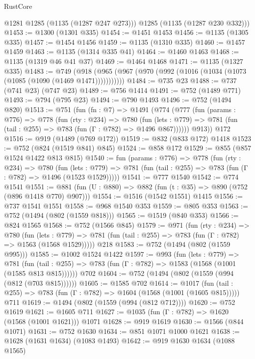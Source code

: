 \begin{lexlean}{RustCore}
\begin{coremodule}
        @1281
        @1285
        (@1135 (@1287 @247 @273)))
      @1285
      (@1135 (@1287 @230 @332)))
@1453 := @1300 (@1301 @335)
@1454 := @1451 @1453
@1456 := @1135 (@1305 @335)
@1457 := @1454 @1456
@1459 := @1135 (@1310 @335)
@1460 := @1457 @1459
@1463 := @1135 (@1314 @335 @41)
@1464 := @1460 @1463
@1468 := @1135 (@1319 @46 @41 @37)
@1469 := @1464 @1468
@1471 := @1135 (@1327 @335)
@1483 := @749
    (@918 (@965 (@967 (@970 (@992 (@1016 (@1034 (@1073 (@1085 (@1090 (@1469 @1471)))))))))))
@1484 := @735 @23
@1488 := @737 (@741 @23) (@747 @23)
@1489 := @756 @1414
@1491 := @752 (@1489 @771)
@1493 := @794 (@795 @23)
@1494 := @790 @1493
@1496 := @752 (@1494 @820)
@1513 := @751
    (fun (fn : @7) =>
    @1491
      (@774
        (@777
          (fun (params : @776) =>
          @778
            (fun (rty : @234) =>
            @780
              (fun (lets : @779) =>
              @781 (fun (tail : @255) => @783 (fun (Γ : @782) => @1496 @867))))))
        @913))
    @172
@1516 := @919 (@1489 (@769 @172))
@1519 := @832 (@833 @172) @1418
@1523 := @752 (@824 (@1519 @841) @845)
@1524 := @858 @172
@1529 := @855 (@857 @1524 @1422 @813 @815)
@1540 := fun (params : @776) =>
  @778
    (fun (rty : @234) =>
    @780
      (fun (lets : @779) =>
      @781 (fun (tail : @255) => @783 (fun (Γ : @782) => @1496 (@1523 @1529)))))
@1541 := @777 @1540
@1542 := @774 @1541
@1551 := @881 (fun (U : @880) => @882 (fun (t : @35) => @890 (@752 (@896 @1418 @770) @907)))
@1554 := @1516 (@1542 @1551) @1415
@1556 := @737 @1541 @1551
@1558 := @968 @1540 @353
@1559 := @805 @353
@1563 := @752 (@1494 (@802 (@1559 @818)))
@1565 := @1519 (@840 @353)
@1566 := @824 @1565
@1568 := @752 (@1566 @845)
@1579 := @971
    (fun (rty : @234) =>
    @780
      (fun (lets : @779) =>
      @781 (fun (tail : @255) => @783 (fun (Γ : @782) => @1563 (@1568 @1529)))))
    @218
@1583 := @752 (@1494 (@802 (@1559 @995)))
@1585 := @1002 @1524 @1422
@1597 := @993
    (fun (lets : @779) =>
    @781 (fun (tail : @255) => @783 (fun (Γ : @782) => @1583 (@1568 (@1001 (@1585 @813 @815))))))
    @702
@1604 := @752 (@1494 (@802 (@1559 (@994 (@812 (@703 @815))))))
@1605 := @1585 @702
@1614 := @1017
    (fun (tail : @255) => @783 (fun (Γ : @782) => @1604 (@1568 (@1001 (@1605 @815)))))
    @711
@1619 := @1494 (@802 (@1559 (@994 (@812 @712))))
@1620 := @752 @1619
@1621 := @1605 @711
@1627 := @1035 (fun (Γ : @782) => @1620 (@1568 (@1001 @1621))) @1071
@1628 := @919 @1619
@1630 := @1566 (@844 @1071)
@1631 := @752 @1630
@1634 := @851 @1071 @1000 @1621
@1638 := @1628 (@1631 @1634) (@1083 @1493)
@1642 := @919 @1630 @1634 (@1088 @1565)

\end{coremodule}
\end{lexlean}
